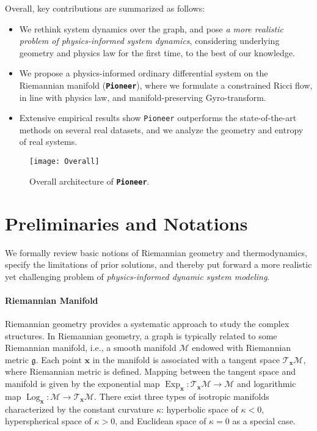 Overall, key contributions are summarized as follows:
\begin{itemize}
\item We rethink system dynamics over the graph, and pose \emph{a more realistic problem of physics-informed system dynamics},  considering underlying geometry and physics law for the first time, to the best of our knowledge.
\item We propose a physics-informed ordinary differential system on the Riemannian manifold (\textbf{\texttt{Pioneer}}), where we formulate a constrained Ricci flow, in line with physics law,  and manifold-preserving Gyro-transform. 
\item Extensive empirical results show \texttt{Pioneer} outperforms the state-of-the-art methods on several real datasets, and we analyze the geometry and entropy of real systems.
\end{itemize}

\begin{figure*}
\centering
    \texttt{[image: Overall]}
     \caption{Overall architecture of \textbf{\texttt{Pioneer}}.  }
    \label{Fig-overall}
\end{figure*}


\section{Preliminaries and Notations}

We formally review basic notions of Riemannian geometry and thermodynamics, 
specify the limitations of prior solutions, 
and thereby put forward a more realistic yet challenging problem of \emph{physics-informed dynamic system modeling}.


\paragraph{Riemannian Manifold}
Riemannian geometry provides a systematic approach to study the complex structures. 
In Riemannian geometry, a graph is typically related to some Riemannian manifold, i.e., a smooth manifold $\mathcal M$ endowed with Riemannian metric $\mathfrak g$.
Each point $\boldsymbol x$ in the manifold is associated with a tangent space $\mathcal T_{\boldsymbol x}\mathcal M$, where  Riemannian metric is defined.
Mapping between the tangent space and manifold is given by 
the exponential map $\operatorname{Exp}_{\boldsymbol x}: \mathcal T_{\boldsymbol x}\mathcal M \to \mathcal M$ and logarithmic map $\operatorname{Log}_{\boldsymbol x}:  \mathcal M \to \mathcal T_{\boldsymbol x}\mathcal M$.
There exist three types of isotropic manifolds characterized by the constant curvature $\kappa$: 
hyperbolic space of $\kappa<0$, 
hyperspherical space of $\kappa>0$, 
and Euclidean space of $\kappa=0$ as a special case.


